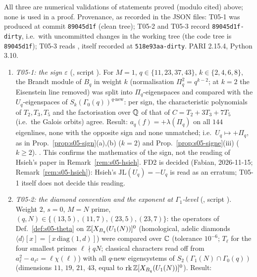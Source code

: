 \begin{remark}\label{rem:s05-computed}
All three are numerical validations of statements proved (modulo cited) above; none is used in a proof. Provenance, as recorded in the JSON files: T05-1 was produced at commit \texttt{89045d1f} (clean tree); T05-2 and T05-3 record
\texttt{89045d1f}\texttt{-dirty}, i.e.\ with uncommitted changes in the working tree (the code tree is \texttt{89045d1f}); T05-3 reads
, itself recorded at \texttt{518e93aa}\texttt{-dirty}. PARI 2.15.4, Python 3.10.
\begin{enumerate}[label=(\arabic*)]
\item \emph{T05-1: the sign $\varepsilon$} (, script
  ). For $M=1$, $q\in\{11,23,37,43\}$, $k\in\{2,4,6,8\}$, the Brandt module of
  $B_q$ in weight $k$ (normalisation $\Pi_q^2=q^{k-2}$; at $k=2$ the Eisenstein line removed) was split into $\Pi_q$-eigenspaces and
  compared with the $U_q$-eigenspaces of $S_k(\Gamma_0(q))^{q\text{-new}}$: per sign, the characteristic polynomials of $T_2,T_3,T_5$ and the
  factorisation over $\mathbb{Q}$ of that of $C=T_2+3T_3+7T_5$ (i.e.\ the Galois orbits) agree. Result: $a_q(f)=+\lambda(\Pi_q)$ on all $144$
  eigenlines, none with the opposite sign and none unmatched; i.e.\ $U_q\mapsto+\Pi_q$, as in Prop.~\ref{prop:s05-sign}(a),(b) ($k=2$) and
  Prop.~\ref{prop:s05-signe}(iii) ($k\ge2$). \stcomp. This confirms the mathematics of the sign, not the reading of Hsieh's paper in
  Remark~\ref{rem:s05-hsieh}. FD2 is decided (Fabian, 2026-11-15; Remark~\ref{rem:s05-hsieh}): Hsieh's $\mathrm{JL}(U_q)=-U_q$ is read as an erratum; T05-1 itself does not decide this reading.
\item \emph{T05-2: the diamond convention and the exponent at $\Gamma_1$-level} (, script
  ). Weight $2$, $s=0$, $M=N$ prime, $(q,N)\in\{(13,5),(11,7),(23,5),(23,7)\}$:
  the operators of Def.~\ref{def:s05-theta} on $\mathbb{Z}[X_{B_q}(U_1(N))]^0$ (homological, adelic diamonds $\langle d\rangle[x]=[x\,\mathrm{diag}(1,d)]$) were
  compared over $\mathbb{C}$ (tolerance $10^{-6}$; $T_\ell$ for the four smallest primes $\ell\nmid qN$; classical characters read off from
  $a_\ell^2-a_{\ell^2}=\ell\chi(\ell)$) with all $q$-new eigensystems of $S_2(\Gamma_1(N)\cap\Gamma_0(q))$ (dimensions $11$, $19$, $21$, $43$, equal to $\operatorname{rk}\mathbb{Z}[X_{B_q}(U_1(N))]^0$). Result:
  \begin{itemize}

\end{itemize}
\end{enumerate}
\end{remark}
